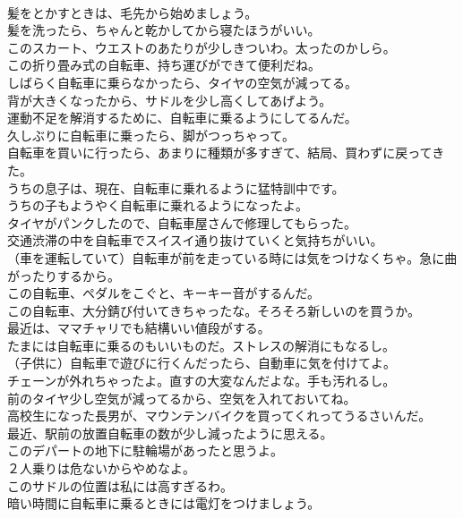 \documentclass[8pt]{extreport}
\begin{document}
\begin{CJK}{UTF8}{min}
\\	髪をとかすときは、毛先から始めましょう。	
\\	髪を洗ったら、ちゃんと乾かしてから寝たほうがいい。	
\\	このスカート、ウエストのあたりが少しきついわ。太ったのかしら。	
\\	この折り畳み式の自転車、持ち運びができて便利だね。	
\\	しばらく自転車に乗らなかったら、タイヤの空気が減ってる。	
\\	背が大きくなったから、サドルを少し高くしてあげよう。	
\\	運動不足を解消するために、自転車に乗るようにしてるんだ。	
\\	久しぶりに自転車に乗ったら、脚がつっちゃって。	
\\	自転車を買いに行ったら、あまりに種類が多すぎて、結局、買わずに戻ってきた。	
\\	うちの息子は、現在、自転車に乗れるように猛特訓中です。	
\\	うちの子もようやく自転車に乗れるようになったよ。	
\\	タイヤがパンクしたので、自転車屋さんで修理してもらった。	
\\	交通渋滞の中を自転車でスイスイ通り抜けていくと気持ちがいい。	
\\	（車を運転していて）自転車が前を走っている時には気をつけなくちゃ。急に曲がったりするから。	
\\	この自転車、ペダルをこぐと、キーキー音がするんだ。	
\\	この自転車、大分錆び付いてきちゃったな。そろそろ新しいのを買うか。	
\\	最近は、ママチャリでも結構いい値段がする。	
\\	たまには自転車に乗るのもいいものだ。ストレスの解消にもなるし。	
\\	（子供に）自転車で遊びに行くんだったら、自動車に気を付けてよ。	
\\	チェーンが外れちゃったよ。直すの大変なんだよな。手も汚れるし。	
\\	前のタイヤ少し空気が減ってるから、空気を入れておいてね。	
\\	高校生になった長男が、マウンテンバイクを買ってくれってうるさいんだ。	
\\	最近、駅前の放置自転車の数が少し減ったように思える。	
\\	このデパートの地下に駐輪場があったと思うよ。	
\\	２人乗りは危ないからやめなよ。	
\\	このサドルの位置は私には高すぎるわ。	
\\	暗い時間に自転車に乗るときには電灯をつけましょう。	

\end{CJK}
\end{document}
